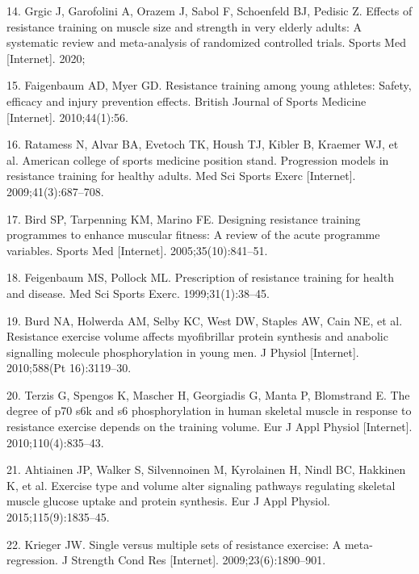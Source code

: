 \documentclass[twoside,10pt]{gihclass} %
\begin{document}
\leavevmode\hypertarget{ref-RN2534}{}%
14. Grgic J, Garofolini A, Orazem J, Sabol F, Schoenfeld BJ, Pedisic Z. Effects of resistance training on muscle size and strength in very elderly adults: A systematic review and meta-analysis of randomized controlled trials. Sports Med {[}Internet{]}. 2020;

\leavevmode\hypertarget{ref-RN2536}{}%
15. Faigenbaum AD, Myer GD. Resistance training among young athletes: Safety, efficacy and injury prevention effects. British Journal of Sports Medicine {[}Internet{]}. 2010;44(1):56.

\leavevmode\hypertarget{ref-RN1}{}%
16. Ratamess N, Alvar BA, Evetoch TK, Housh TJ, Kibler B, Kraemer WJ, et al. American college of sports medicine position stand. Progression models in resistance training for healthy adults. Med Sci Sports Exerc {[}Internet{]}. 2009;41(3):687--708.

\leavevmode\hypertarget{ref-RN798}{}%
17. Bird SP, Tarpenning KM, Marino FE. Designing resistance training programmes to enhance muscular fitness: A review of the acute programme variables. Sports Med {[}Internet{]}. 2005;35(10):841--51.

\leavevmode\hypertarget{ref-RN2538}{}%
18. Feigenbaum MS, Pollock ML. Prescription of resistance training for health and disease. Med Sci Sports Exerc. 1999;31(1):38--45.

\leavevmode\hypertarget{ref-RN791}{}%
19. Burd NA, Holwerda AM, Selby KC, West DW, Staples AW, Cain NE, et al. Resistance exercise volume affects myofibrillar protein synthesis and anabolic signalling molecule phosphorylation in young men. J Physiol {[}Internet{]}. 2010;588(Pt 16):3119--30.

\leavevmode\hypertarget{ref-RN784}{}%
20. Terzis G, Spengos K, Mascher H, Georgiadis G, Manta P, Blomstrand E. The degree of p70 s6k and s6 phosphorylation in human skeletal muscle in response to resistance exercise depends on the training volume. Eur J Appl Physiol {[}Internet{]}. 2010;110(4):835--43.

\leavevmode\hypertarget{ref-RN1837}{}%
21. Ahtiainen JP, Walker S, Silvennoinen M, Kyrolainen H, Nindl BC, Hakkinen K, et al. Exercise type and volume alter signaling pathways regulating skeletal muscle glucose uptake and protein synthesis. Eur J Appl Physiol. 2015;115(9):1835--45.

\leavevmode\hypertarget{ref-RN793}{}%
22. Krieger JW. Single versus multiple sets of resistance exercise: A meta-regression. J Strength Cond Res {[}Internet{]}. 2009;23(6):1890--901.
\end{document}

